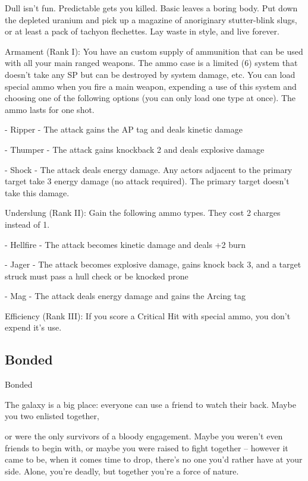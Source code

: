 Dull isn’t fun. Predictable gets you killed. Basic leaves a boring body. Put down the depleted uranium and  
pick up a magazine of anoriginary stutter-blink slugs, or at least a pack of tachyon flechettes. Lay waste in  
style, and live forever.  

Armament (Rank I): You have an custom supply of ammunition that can be used with all your  
main ranged weapons. The ammo case is a limited (6) system that doesn’t take any SP but can  
be destroyed by system damage, etc. You can load special ammo when you fire a main weapon,  
expending a use of this system and choosing one of the following options (you can only load one  
type at once). The ammo lasts for one shot.
 
         	- Ripper - The attack gains the AP tag and deals kinetic damage
 
         	- Thumper - The attack gains knockback 2 and deals explosive damage
 
         	- Shock - The attack deals energy damage. Any actors adjacent to the primary target  
         take 3 energy damage (no attack required). The primary target doesn’t take this damage.
 
Underslung (Rank II): Gain the following ammo types. They cost 2 charges instead of 1.
 
         	- Hellfire - The attack becomes kinetic damage and deals +2 burn
 
         - Jager - The attack becomes explosive damage, gains knock back 3, and a target struck  
         must pass a hull check or be knocked prone
 
         	- Mag - The attack deals energy damage and gains the Arcing tag
 
Efficiency (Rank III): If you score a Critical Hit with special ammo, you don’t expend it’s use.
 

                                                                                                                 
\subsection{Bonded}


                                                     Bonded  

The galaxy is a big place: everyone can use a friend to watch their back. Maybe you two enlisted together,  

or were the only survivors of a bloody engagement. Maybe you weren’t even friends to begin with, or  
maybe you were raised to fight together  -- however it came to be, when it comes time to drop, there’s no  
one you’d rather have at your side. Alone, you’re deadly, but together you’re a force of nature.    

